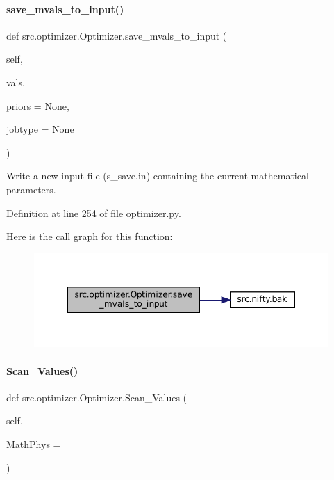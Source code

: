 \paragraph{\texorpdfstring{save\+\_\+mvals\+\_\+to\+\_\+input()}{save\_mvals\_to\_input()}}
{\footnotesize\ttfamily def src.\+optimizer.\+Optimizer.\+save\+\_\+mvals\+\_\+to\+\_\+input (\begin{DoxyParamCaption}\item[{}]{self,  }\item[{}]{vals,  }\item[{}]{priors = {\ttfamily None},  }\item[{}]{jobtype = {\ttfamily None} }\end{DoxyParamCaption})}



Write a new input file (s\+\_\+save.\+in) containing the current mathematical parameters. 



Definition at line 254 of file optimizer.\+py.

Here is the call graph for this function\+:
\nopagebreak
\begin{figure}[H]
\begin{center}
\leavevmode
\includegraphics[width=348pt]{classsrc_1_1optimizer_1_1Optimizer_ad9b6a3c28ccacbbe26504e1e7676b244_cgraph}
\end{center}
\end{figure}
\mbox{\label{classsrc_1_1optimizer_1_1Optimizer_a98e20ccc6c2d2cf5f6c611a0441e14bb}} 
\paragraph{\texorpdfstring{Scan\+\_\+\+Values()}{Scan\_Values()}}
{\footnotesize\ttfamily def src.\+optimizer.\+Optimizer.\+Scan\+\_\+\+Values (\begin{DoxyParamCaption}\item[{}]{self,  }\item[{}]{Math\+Phys = {} }\end{DoxyParamCaption})}



